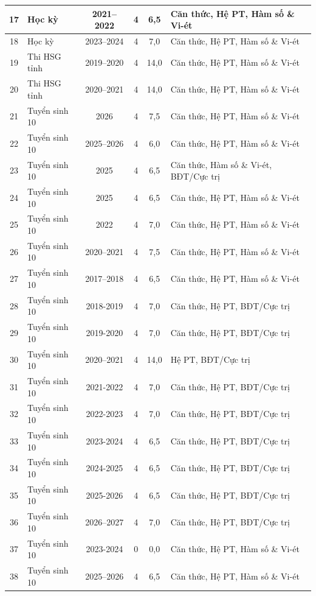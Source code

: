 \begin{center}
\begin{longtable}{|c|l|c|c|c|p{4.2cm}|}
17 & Học kỳ & 2021--2022 & 4 & 6,5 & Căn thức, Hệ PT, Hàm số \& Vi-ét \\ \hline
18 & Học kỳ & 2023--2024 & 4 & 7,0 & Căn thức, Hệ PT, Hàm số \& Vi-ét \\ \hline
19 & Thi HSG tỉnh & 2019--2020 & 4 & 14,0 & Căn thức, Hệ PT, Hàm số \& Vi-ét \\ \hline
20 & Thi HSG tỉnh & 2020--2021 & 4 & 14,0 & Căn thức, Hệ PT, Hàm số \& Vi-ét \\ \hline
21 & Tuyển sinh 10 & 2026 & 4 & 7,5 & Căn thức, Hệ PT, Hàm số \& Vi-ét \\ \hline
22 & Tuyển sinh 10 & 2025--2026 & 4 & 6,0 & Căn thức, Hệ PT, Hàm số \& Vi-ét \\ \hline
23 & Tuyển sinh 10 & 2025 & 4 & 6,5 & Căn thức, Hàm số \& Vi-ét, BĐT/Cực trị \\ \hline
24 & Tuyển sinh 10 & 2025 & 4 & 6,5 & Căn thức, Hệ PT, Hàm số \& Vi-ét \\ \hline
25 & Tuyển sinh 10 & 2022 & 4 & 7,0 & Căn thức, Hệ PT, Hàm số \& Vi-ét \\ \hline
26 & Tuyển sinh 10 & 2020--2021 & 4 & 7,5 & Căn thức, Hệ PT, Hàm số \& Vi-ét \\ \hline
27 & Tuyển sinh 10 & 2017--2018 & 4 & 6,5 & Căn thức, Hệ PT, Hàm số \& Vi-ét \\ \hline
28 & Tuyển sinh 10 & 2018-2019 & 4 & 7,0 & Căn thức, Hệ PT, BĐT/Cực trị \\ \hline
29 & Tuyển sinh 10 & 2019-2020 & 4 & 7,0 & Căn thức, Hệ PT, BĐT/Cực trị \\ \hline
30 & Tuyển sinh 10 & 2020--2021 & 4 & 14,0 & Hệ PT, BĐT/Cực trị \\ \hline
31 & Tuyển sinh 10 & 2021-2022 & 4 & 7,0 & Căn thức, Hệ PT, BĐT/Cực trị \\ \hline
32 & Tuyển sinh 10 & 2022-2023 & 4 & 7,0 & Căn thức, Hệ PT, BĐT/Cực trị \\ \hline
33 & Tuyển sinh 10 & 2023-2024 & 4 & 6,5 & Căn thức, Hệ PT, BĐT/Cực trị \\ \hline
34 & Tuyển sinh 10 & 2024-2025 & 4 & 6,5 & Căn thức, Hệ PT, BĐT/Cực trị \\ \hline
35 & Tuyển sinh 10 & 2025-2026 & 4 & 6,5 & Căn thức, Hệ PT, BĐT/Cực trị \\ \hline
36 & Tuyển sinh 10 & 2026--2027 & 4 & 7,0 & Căn thức, Hệ PT, BĐT/Cực trị \\ \hline
37 & Tuyển sinh 10 & 2023-2024 & 0 & 0,0 & Căn thức, Hệ PT, Hàm số \& Vi-ét \\ \hline
38 & Tuyển sinh 10 & 2025--2026 & 4 & 6,5 & Căn thức, Hệ PT, Hàm số \& Vi-ét \\ \hline

\end{longtable}
\end{center}
